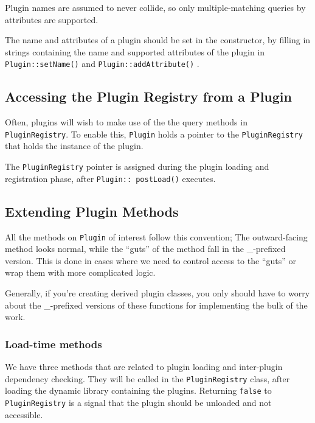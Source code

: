 Plugin names are assumed to never collide, so only multiple-matching
queries by attributes are supported.

The name and attributes of a plugin should be set in the constructor,
by filling in strings 
containing the name and supported attributes of the plugin in
{\tt Plugin::setName()} and {\tt Plugin::addAttribute()} .


\subsection{Accessing the Plugin Registry from a Plugin}

Often, plugins will wish to make use of the the query methods in 
{\tt PluginRegistry}. To enable this, {\tt Plugin} holds a pointer
to the {\tt PluginRegistry} that holds the instance of the plugin. 

The {\tt PluginRegistry} pointer is assigned during the plugin 
loading and registration phase, after 
{\tt Plugin:: postLoad()}
executes.

\subsection{Extending Plugin Methods}

All the methods on {\tt Plugin} of interest follow this convention; The
outward-facing method looks normal, while the ``guts'' of the
method fall in the \_-prefixed version. This is done in cases where
we need to control access to the ``guts'' or wrap them with
more complicated logic.

Generally, if you're creating derived plugin classes, you only 
should have to worry about the \_-prefixed versions of these functions
for implementing the bulk of the work.

\subsubsection{Load-time methods}

We have three methods that are related to plugin loading
and inter-plugin dependency checking. They will be called
in the {\tt PluginRegistry} class, after loading the dynamic 
library containing the plugins. Returning {\tt false} to {\tt PluginRegistry}
is a signal that the plugin should be unloaded and not accessible.

